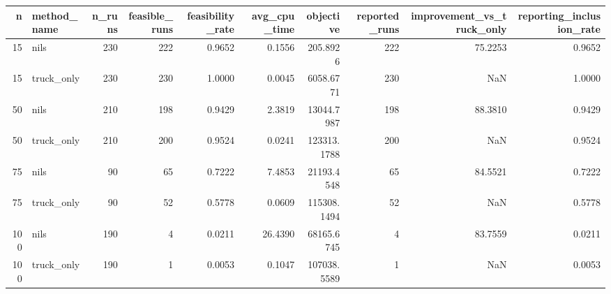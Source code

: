 \begin{tabular}{rlrrrrrrrr}
\toprule
n & method_name & n_runs & feasible_runs & feasibility_rate & avg_cpu_time & objective & reported_runs & improvement_vs_truck_only & reporting_inclusion_rate \\
\midrule
15 & nils & 230 & 222 & 0.9652 & 0.1556 & 205.8926 & 222 & 75.2253 & 0.9652 \\
15 & truck_only & 230 & 230 & 1.0000 & 0.0045 & 6058.6771 & 230 & NaN & 1.0000 \\
50 & nils & 210 & 198 & 0.9429 & 2.3819 & 13044.7987 & 198 & 88.3810 & 0.9429 \\
50 & truck_only & 210 & 200 & 0.9524 & 0.0241 & 123313.1788 & 200 & NaN & 0.9524 \\
75 & nils & 90 & 65 & 0.7222 & 7.4853 & 21193.4548 & 65 & 84.5521 & 0.7222 \\
75 & truck_only & 90 & 52 & 0.5778 & 0.0609 & 115308.1494 & 52 & NaN & 0.5778 \\
100 & nils & 190 & 4 & 0.0211 & 26.4390 & 68165.6745 & 4 & 83.7559 & 0.0211 \\
100 & truck_only & 190 & 1 & 0.0053 & 0.1047 & 107038.5589 & 1 & NaN & 0.0053 \\
\bottomrule
\end{tabular}
